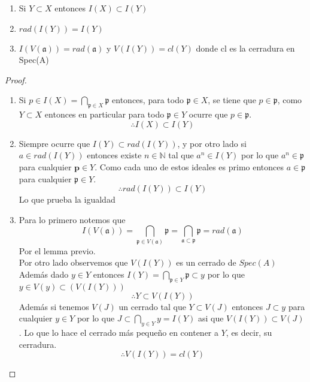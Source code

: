 \documentclass[14pt]{extarticle}
\begin{document}
\begin{lema}{}{}
    \begin{enumerate}
        \item Si $Y \subset X$ entonces $I(X) \subset I(Y)$
        \item $rad(I(Y)) = I(Y)$
        \item $I(V(\mathfrak{a})) = rad(\mathfrak{a}) $
        y $V(I(Y)) = cl(Y)$ donde cl es la cerradura en Spec(A)
        \end{enumerate}
\end{lema}
\begin{proof}
    \begin{enumerate}
        \item Si $p \in I(X) = \bigcap_{\mathfrak{p}\in X}\mathfrak{p}$
        entonces, para todo $\mathfrak{p}\in X$, se tiene que $p\in \mathfrak{p}$,
        como $Y \subset X$ entonces en particular para todo $\mathfrak{p}\in Y$
        ocurre que $p \in \mathfrak{p}$.
        $$\therefore I(X) \subset I(Y)$$
        \item Siempre ocurre que $I(Y)\subset rad(I(Y))$, y por otro lado
        si $a \in rad(I(Y))$ entonces existe $n\in \mathbb{N}$ tal que $a^n \in I(Y)$
        por lo que $a^n \in \mathfrak{p}$ para cualquier $\mathbf{p}\in Y$. 
        Como cada uno de estos ideales es primo entonces $a \in \mathfrak{p}$ para cualquier 
        $\mathfrak{p}\in Y$.
        $$\therefore rad(I(Y)) \subset I(Y)$$
        Lo que prueba la igualdad
        \item Para lo primero notemos que
        $$I(V(\mathfrak{a}))=\bigcap_{\mathfrak{p}\in V(\mathfrak{a})} \mathfrak{p}
        = \bigcap_{\mathfrak{a}\subset \mathfrak{p}} \mathfrak{p}
        = rad(\mathfrak{a})$$
        Por el lemma previo.
        \\
        Por otro lado observemos que $V(I(Y))$ es un cerrado de $Spec(A)$
        Además dado $y\in Y$ entonces $I(Y) = \bigcap_{\mathfrak{p}\in Y} \mathfrak{p}
        \subset y $ por lo que $y \in V(y) \subset (V(I(Y)))$
        $$\therefore Y\subset V(I(Y))$$
        Además si tenemos $V(J)$ un cerrado tal que $Y \subset V(J)$ entonces
        $J \subset y$ para cualquier $y \in Y$ por lo que $J \subset \bigcap_{y \in Y} y = I(Y)$
        asi que $V(I(Y)) \subset V(J)$.
        Lo que lo hace el cerrado más pequeño en contener a $Y$, es decir,
        su cerradura.
        $$\therefore V(I(Y)) = cl(Y)$$
    \end{enumerate}
\end{proof}
\end{document}
